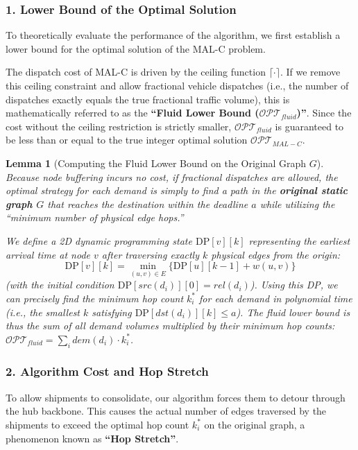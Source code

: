 \documentclass[12pt, a4paper]{article}
\newtheorem{lemma}{Lemma}
\begin{document}
\subsubsection*{1. Lower Bound of the Optimal Solution}

To theoretically evaluate the performance of the algorithm, we first establish a lower bound for the optimal solution of the MAL-C problem.

The dispatch cost of MAL-C is driven by the ceiling function $\lceil \cdot \rceil$. If we remove this ceiling constraint and allow fractional vehicle dispatches (i.e., the number of dispatches exactly equals the true fractional traffic volume), this is mathematically referred to as the \textbf{``Fluid Lower Bound ($\mathcal{OPT}_{fluid}$)''}. Since the cost without the ceiling restriction is strictly smaller, $\mathcal{OPT}_{fluid}$ is guaranteed to be less than or equal to the true integer optimal solution $\mathcal{OPT}_{MAL-C}$.

\begin{lemma}[Computing the Fluid Lower Bound on the Original Graph $G$]
Because node buffering incurs no cost, if fractional dispatches are allowed, the optimal strategy for each demand is simply to find a path in the \textbf{original static graph $G$} that reaches the destination within the deadline $a$ while utilizing the ``minimum number of physical edge hops.''

We define a 2D dynamic programming state $\text{DP}[v][k]$ representing the earliest arrival time at node $v$ after traversing exactly $k$ physical edges from the origin:
\begin{equation}
    \text{DP}[v][k] = \min_{(u,v) \in E} \{ \text{DP}[u][k-1] + w(u,v) \}
\end{equation}
(with the initial condition $\text{DP}[src(d_i)][0] = rel(d_i)$). Using this DP, we can precisely find the minimum hop count $k_i^*$ for each demand in polynomial time (i.e., the smallest $k$ satisfying $\text{DP}[dst(d_i)][k] \le a$). The fluid lower bound is thus the sum of all demand volumes multiplied by their minimum hop counts: $\mathcal{OPT}_{fluid} = \sum_{i} dem(d_i) \cdot k_i^*$.
\end{lemma}

\subsubsection*{2. Algorithm Cost and Hop Stretch}

To allow shipments to consolidate, our algorithm forces them to detour through the hub backbone. This causes the actual number of edges traversed by the shipments to exceed the optimal hop count $k_i^*$ on the original graph, a phenomenon known as \textbf{``Hop Stretch''}.
\end{document}
